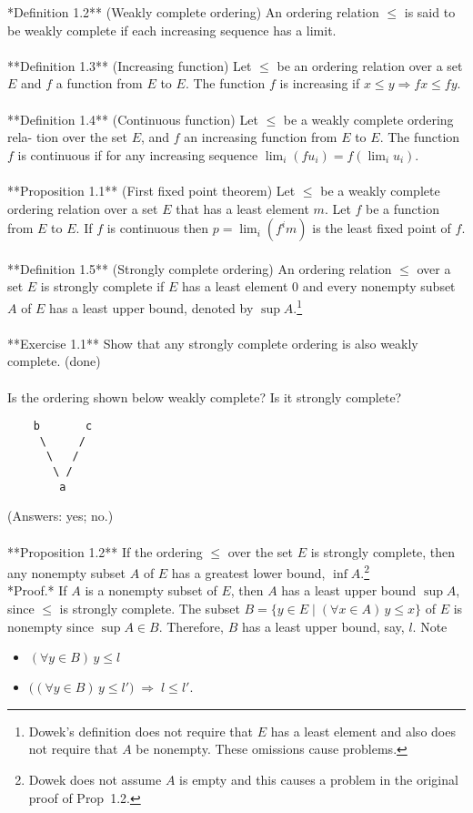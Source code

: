 \noindent **Definition 1.2** (Weakly complete ordering) An ordering relation $\leq$ is said to be
weakly complete if each increasing sequence has a limit.\\
\\
**Definition 1.3** (Increasing function) Let $\leq$ be an ordering relation over
a set $E$ and $f$ a function from $E$ to $E$. The function $f$ is increasing if
$x \leq y \Rightarrow f x \leq fy$. \\
\\
**Definition 1.4** (Continuous function) Let $\leq$ be a weakly complete ordering rela-
tion over the set $E$, and $f$ an increasing function from $E$ to $E$. The function $f$ is
continuous if for any increasing sequence $\lim_i (f u_i ) = f (\lim_i u_i )$.\\
\\
**Proposition 1.1** (First fixed point theorem) Let $\leq$ be a weakly complete ordering
relation over a set $E$ that has a least element $m$. Let $f$ be a function from 
$E$ to $E$. If $f$ is continuous then $p = \lim_i (f^i m)$ is the least fixed
point of $f$. \\
\\
**Definition 1.5** (Strongly complete ordering) An ordering relation $\leq$ over a set $E$
is strongly complete if $E$ has a least element 0 and every nonempty subset $A$ of
$E$ has a least upper bound, denoted by $\sup A$.\footnote{Dowek's definition
  does not require that $E$ has a least element and also does not require that
  $A$ be nonempty.  These omissions cause problems.} \\
\\
**Exercise 1.1** Show that any strongly complete ordering is also weakly complete.  
(done)\\
\\
Is the ordering shown below weakly complete? Is it strongly complete?  

\begin{verbatim}
    b       c
     \     /
      \   /
       \ /
        a
\end{verbatim}
(Answers: yes; no.)\\
\\
**Proposition 1.2** If the ordering $\leq$ over the set $E$ is strongly
complete, then any nonempty subset $A$ of $E$ has a greatest lower bound, 
$\inf A$.\footnote{Dowek does not assume $A$ is empty and this causes a problem
  in the original proof of Prop~1.2.}\\[4pt]
*Proof.* If $A$ is a nonempty subset of $E$, then $A$ has a least upper bound
$\sup  A$, since $\leq$ is strongly complete. 
The subset $B = \{ y \in E \mid (\forall x \in A)\, y \leq x \}$ 
of $E$ is nonempty since $\sup A\in B$.
Therefore, $B$ has a least upper bound, say, $l$. Note
\begin{itemize}
\item $(\forall y\in B) \, y \leq l$
\item $\bigl((\forall y\in B)\, y \leq l'\bigr)\; \Rightarrow \; l \leq l'$.
\end{itemize}

